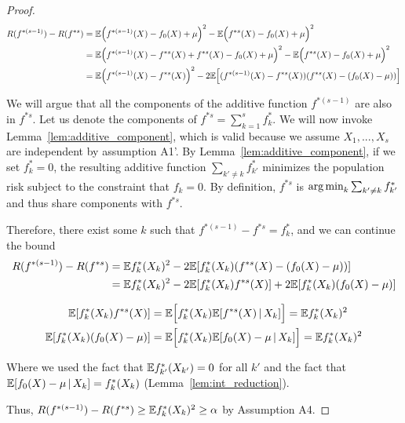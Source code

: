 \begin{proof}

\begin{align*}
R(f^{*(s-1)}) - R(f^{*s}) &= {\mathbb E}\Big(f^{*(s-1)}(X) - f_0(X) + \mu\Big)^2 
                              - {\mathbb E}\Big(f^{*s}(X) - f_0(X) + \mu\Big)^2 \\
    &= {\mathbb E}\Big( f^{*(s-1)}(X) - f^{*s}(X) + f^{*s}(X) - f_0(X) + \mu\Big)^2 
                                 - {\mathbb E}\Big(f^{*s}(X) - f_0(X) + \mu\Big)^2 \\
    &= {\mathbb E}\Big( f^{*(s-1)}(X) - f^{*s}(X)\Big)^2 
                - 2 {\mathbb E}\Big[ (f^{*(s-1)}(X) - f^{*s}(X)) (f^{*s}(X) - (f_0(X)-\mu)) \Big]
\end{align*}

We will argue that all the components of the additive function $f^{*(s-1)}$ are also in $f^{*s}$. Let us denote the components of $f^{*s} = \sum_{k=1}^s f_k^*$. We will now invoke Lemma~\ref{lem:additive_component}, which is valid because we assume $X_1,...,X_s$ are independent by assumption A1'. By Lemma~\ref{lem:additive_component}, if we set $f^*_k = 0$, the resulting additive function $\sum_{k'\neq k} f_{k'}^*$ minimizes the population risk subject to the constraint that $f_k = 0$. By definition, $f^{*s}$ is $\mathop{\text{\rm arg\,min}}_k \sum_{k'\neq k} f_{k'}^*$ and thus share components with $f^{*s}$.

Therefore, there exist some $k$ such that $f^{*(s-1)} - f^{*s} = f^*_k$, and we can continue the bound
\begin{align*}
R(f^{*(s-1)}) - R(f^{*s}) &= {\mathbb E} f^*_k(X_k)^2 - 2 {\mathbb E}[ f^*_k(X_k) ( f^{*s}(X) - (f_0(X)-\mu) )] \\
    &= {\mathbb E} f^*_k(X_k)^2 - 2 {\mathbb E}[ f^*_k(X_k) f^{*s} (X)] + 2 {\mathbb E}[ f^*_k(X_k) (f_0(X)-\mu) ] 
\end{align*}

\begin{align*}
{\mathbb E}[ f^*_k(X_k) f^{*s} (X)]  &= {\mathbb E}\Big[ f^*_k (X_k) {\mathbb E}[ f^{*s} (X) \,|\, X_k ] \Big] = {\mathbb E} f^*_k(X_k)^2  \\
{\mathbb E}[ f^*_k(X_k)(f_0(X) - \mu) ] &= {\mathbb E}\Big[ f^*_k(X_k) {\mathbb E}[ f_0(X) - \mu \,|\, X_k ] \Big] = {\mathbb E} f^*_k(X_k)^2 
\end{align*}

Where we used the fact that ${\mathbb E} f^*_{k'} (X_{k'}) = 0$ for all $k'$ and the fact that ${\mathbb E}[ f_0(X) - \mu \,|\, X_k] = f^*_k(X_k)$ (Lemma~\ref{lem:int_reduction}).

Thus, $R(f^{*(s-1)}) - R(f^{*s}) \geq {\mathbb E} f^*_k(X_k)^2 \geq \alpha$ by Assumption A4.

\end{proof}


